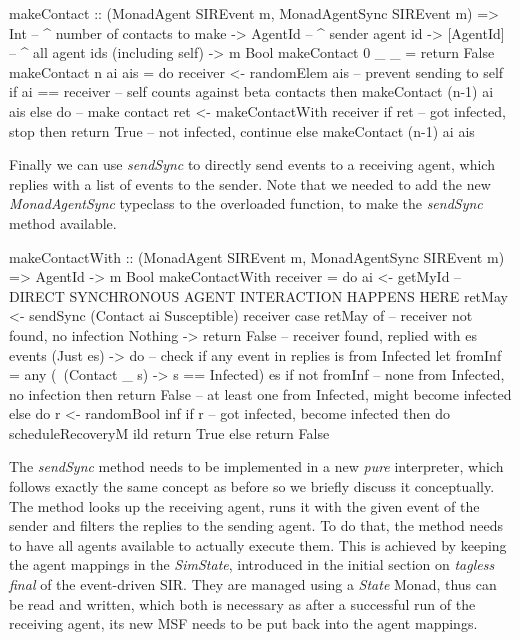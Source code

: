 \begin{HaskellCode}
makeContact :: (MonadAgent SIREvent m, MonadAgentSync SIREvent m)
            => Int       -- ^ number of contacts to make
            -> AgentId   -- ^ sender agent id
            -> [AgentId] -- ^ all agent ids (including self)
            -> m Bool
makeContact 0 _ _ = return False
makeContact n ai ais = do
  receiver <- randomElem ais
  -- prevent sending to self
  if ai == receiver
    -- self counts against beta contacts
    then makeContact (n-1) ai ais
    else do
      -- make contact
      ret <- makeContactWith receiver
      if ret
        -- got infected, stop
        then return True
        -- not infected, continue
        else makeContact (n-1) ai ais
\end{HaskellCode}

Finally we can use \textit{sendSync} to directly send events to a receiving agent, which replies with a list of events to the sender. Note that we needed to add the new \textit{MonadAgentSync} typeclass to the overloaded function, to make the \textit{sendSync} method available.

\begin{HaskellCode}
makeContactWith :: (MonadAgent SIREvent m, MonadAgentSync SIREvent m) 
                => AgentId -> m Bool
makeContactWith receiver = do
  ai     <- getMyId
  -- DIRECT SYNCHRONOUS AGENT INTERACTION HAPPENS HERE
  retMay <- sendSync (Contact ai Susceptible) receiver
  case retMay of 
    -- receiver not found, no infection
    Nothing -> return False
    -- receiver found, replied with es events
    (Just es) -> do
      -- check if any event in replies is from Infected
      let fromInf = any (\ (Contact _ s) -> s == Infected) es
      if not fromInf
        -- none from Infected, no infection
        then return False
        -- at least one from Infected, might become infected
        else do
          r <- randomBool inf
          if r 
            -- got infected, become infected
            then do
              scheduleRecoveryM ild
              return True
            else return False
\end{HaskellCode}

The \textit{sendSync} method needs to be implemented in a new \textit{pure} interpreter, which follows exactly the same concept as before so we briefly discuss it conceptually. The method looks up the receiving agent, runs it with the given event of the sender and filters the replies to the sending agent. To do that, the method needs to have all agents available to actually execute them. This is achieved by keeping the agent mappings in the \textit{SimState}, introduced in the initial section on \textit{tagless final} of the event-driven SIR. They are managed using a \textit{State} Monad, thus can be read and written, which both is necessary as after a successful run of the receiving agent, its new MSF needs to be put back into the agent mappings.


